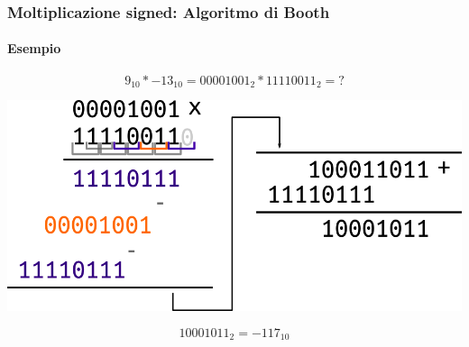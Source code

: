 \documentclass{beamer}
\begin{document}
  \begin{frame}
    \frametitle{Moltiplicazione signed: Algoritmo di Booth}
    \framesubtitle{Esempio}
    $$9_{10} * -13_{10} = 00001001_{2} * 11110011_{2} = ?$$
    \pause
    \begin{center}
    		\includegraphics[width=.8\textwidth]{IMGs/Booth.png}
    \end{center}
    \pause
    \vspace{1em}
    $$10001011_{2} = -117_{10}$$
  \end{frame} 
  
\end{document}
